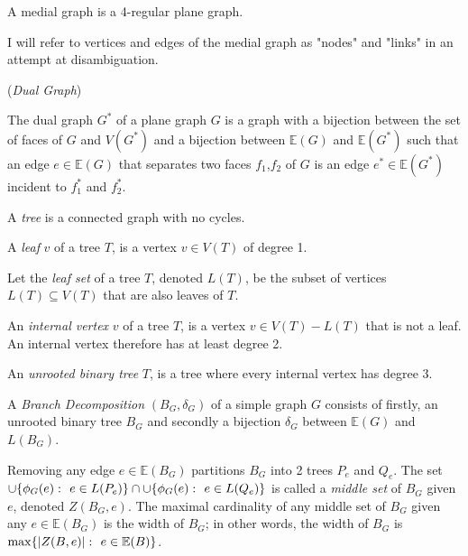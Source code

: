 \documentclass{article}
\begin{document}
	\begin{center}
		
	\end{center}
	
	\begin{corollary}
		A medial graph is a 4-regular plane graph.
	\end{corollary}

	I will refer to vertices and edges of the medial graph as "nodes" and "links" in an attempt at disambiguation.

	\begin{definition}
		(\textit{Dual Graph})

		The dual graph $G^*$ of a plane graph $G$ is a graph with a bijection between the set of faces of $G$ and $V(G^*)$ and a bijection between $\mathbb{E}(G)$ and $\mathbb{E}(G^*)$ such that an edge $e \in \mathbb{E}(G)$ that separates two faces $f_1$,$f_2$ of $G$ is an edge $e^* \in \mathbb{E}(G^*)$ incident to $f_1^*$ and $f_2^*$.
	\end{definition}

	\begin{center}
		
	\end{center}

	A \textit{tree} is a connected graph with no cycles.

	A \textit{leaf} $v$ of a tree $T$, is a vertex $v \in V(T)$ of degree 1.

	Let the \textit{leaf set} of a tree $T$, denoted $L(T)$, be the subset of vertices $L(T) \subseteq V(T)$ that are also leaves of $T$.
	
	An \textit{internal vertex} $v$ of a tree $T$, is a vertex $v \in V(T) - L(T)$ that is not a leaf. An internal vertex therefore has at least degree 2.

	An \textit{unrooted binary tree} $T$, is a tree where every internal vertex has degree 3.

	A \textit{Branch Decomposition} $(B_G, \delta_G)$ of a simple graph $G$ consists of firstly, an unrooted binary tree $B_G$ and secondly a bijection $\delta_G$ between $\mathbb{E}(G)$ and $L(B_G)$.

	Removing any edge $e \in \mathbb{E}(B_G)$ partitions $B_G$ into 2 trees $P_e$ and $Q_e$. The set $\cup\{\phi_G(e) \,\colon\  e \in L(P_e)\} \cap \cup\{\phi_G(e) \,\colon\  e \in L(Q_e)\}$ is called a \textit{middle set} of $B_G$ given $e$, denoted $Z(B_G,e)$. The maximal cardinality of any middle set of $B_G$ given any $e \in \mathbb{E}(B_G)$ is the width of $B_G$; in other words, the width of $B_G$ is $\max\{ |Z(B, e)| \,\colon\  e \in \mathbb{E}(B) \}$.
\end{document}
